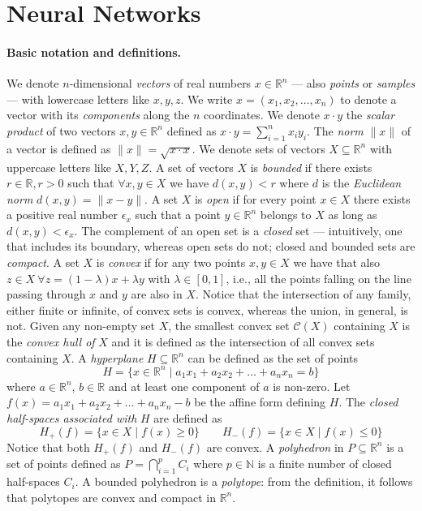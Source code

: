 \section{Neural Networks}
\label{sec:nns}

\paragraph{Basic notation and definitions.} 
We denote $n$-dimensional \emph{vectors} of real numbers 
$x \in \mathbb{R}^n$ --- also \emph{points} or \emph{samples} 
--- with lowercase letters like $x, y, z$. We write
$x = (x_1, x_2, \ldots, x_n)$ to denote a vector with
its \emph{components} along the $n$ coordinates. We denote $x \cdot y$
the \emph{scalar product} of two vectors $x, y \in \mathbb{R}^n$
defined as $x \cdot y = \sum_{i=1}^n x_i y_i$. The \emph{norm} $\lVert
x \rVert$ of a vector is defined as $\lVert x \rVert = \sqrt{x \cdot x}$.
We denote sets of vectors $X \subseteq \mathbb{R}^n$ with uppercase
letters like $X, Y, Z$.  A set of vectors $X$ is  
\emph{bounded} if there exists $r \in \mathbb{R}, r > 0$ such that 
$\forall x, y \in X$ we have $d(x, y) < r$ where $d$ is the 
\emph{Euclidean norm} $d(x, y) = \lVert x - y \rVert$. 
A set $X$ is \emph{open} if for every point $x \in X$ there 
exists a positive real number $\epsilon_x$ such that a point
$y \in \mathbb{R}^n$ belongs to $X$ as long as $d(x,y)
< \epsilon_x$. The complement of an open set is a \emph{closed} set ---
intuitively, one that includes its boundary, whereas open sets do not;
closed and bounded sets are \emph{compact}. A set $X$ is \emph{convex}
if for any two points $x,y \in X$ we have that also $z \in X~\forall 
z = (1 - \lambda)x + \lambda y$ with $\lambda \in
[0,1]$, i.e., all the points falling on the
line passing through $x$ and $y$ are also in $X$. Notice that the
intersection of any family, either finite or infinite, of convex sets
is convex, whereas the union, in general, is not. Given any
non-empty set $X$, the smallest convex set $\mathcal{C}(X)$
containing $X$ is the \emph{convex hull of} $X$ and it is
defined as the intersection of all convex sets containing
$X$. A \emph{hyperplane} $H \subseteq \mathbb{R}^n$ can be
defined as the set of points
\begin{equation*}
	H = \{x \in \mathbb{R}^n \mid a_1x_1 + a_2x_2 + \ldots + a_n x_n =
	b\}
\end{equation*}
where $a \in \mathbb{R}^n$, $b \in \mathbb{R}$ and at least one
component of $a$ is non-zero. Let $f(x) = a_1x_1 + a_2x_2 + \ldots +
a_n x_n - b$ be the affine form defining $H$. The \emph{closed half-spaces
	associated with} $H$ are defined as
\begin{equation*}
	H_{+}(f) = \{x \in X \mid f(x) \geq 0 \} \qquad  H_{-}(f) = \{x \in
	X \mid f(x) \leq 0 \}
\end{equation*}
Notice that both $H_{+}(f)$ and $H_{-}(f)$ are convex. A
\emph{polyhedron} in $P \subseteq \mathbb{R}^n$ is a set of points 
defined as $P= \bigcap_{i=1}^p C_i$ where $p \in \mathbb{N}$ is a
finite number of closed half-spaces $C_i$. A bounded polyhedron is a
\emph{polytope}: from the definition, it follows that polytopes are 
convex and compact in $\mathbb{R}^n$. 


